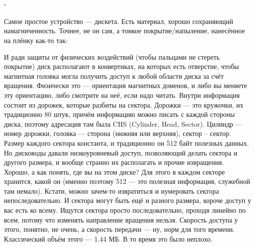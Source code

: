 \documentclass{article}
\begin{document}
    \paragraph{.}
    Самое простое устройство --- дискета. Есть материал, хорошо сохраняющий намагниченность. Точнее, не он сам, а тонкое покрытие/напыление, нанесённое на плёнку как-то так:
    \begin{center}
    \end{center}
    И ради защиты от физических воздействий (чтобы пальцами не стереть покрытие) диск располагают в конвертиках, на которых есть отверстие, чтобы магнитная головка могла получить доступ к любой области диска за счёт вращения. Физически это --- ориентация магнитных доменов, и либо вы меняете эту ориентацию, либо смотрите на неё, если надо читать. Внутри информация состоит из дорожек, которые разбиты на сектора. Дорожки --- это кружочки, их традиционно 80 штук, причём информацию можно писать с каждой стороны диска, поэтому адресация там была CHS (Cylinder, Head, Sector). Цилиндр --- номер дорожки, головка --- сторона (нижняя или верхняя), сектор -- сектор. Размер каждого сектора константа, и традиционно он 512 байт полезных данных. Но дисководы давали низкоуровневый доступ, позволяющий делать сектора и другого размера, и вообще странно их располагать и прочие извращения.\\
    Хорошо, а как понять, где вы на этом диске? Для этого в каждом секторе хранится, какой он (именно поэтому 512 --- это полезная информация, служебной там немало). Кстати, можно зачем-то извратиться и нумеровать сектора непоследовательно. И сектора могут быть ещё и разного размера, короче доступ у вас есть ко всему. Ищутся сектора просто последовательно, проходя линейно по всем, потому что изменять направление вращения нельзя. Скорость доступа у этого, понятно, не очень, а скорость передачи --- ну, норм для того времени. Классический объём этого --- 1.44 МБ. В то время это было неплохо.\\
\end{document}
